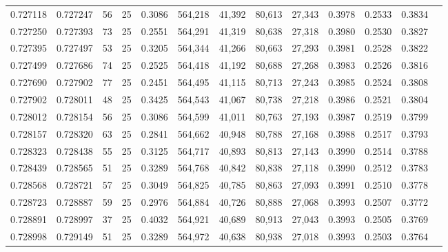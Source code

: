 \begin{tabular}{rrrrrrrrrrrrr}
0.727118 & 0.727247 &    56 &  25 &                                     0.3086 & 564,218 &  41,392 &  80,613 &  27,343 & 0.3978 & 0.2533 & 0.3834 \\
0.727250 & 0.727393 &    73 &  25 &                                     0.2551 & 564,291 &  41,319 &  80,638 &  27,318 & 0.3980 & 0.2530 & 0.3827 \\
0.727395 & 0.727497 &    53 &  25 &                                     0.3205 & 564,344 &  41,266 &  80,663 &  27,293 & 0.3981 & 0.2528 & 0.3822 \\
0.727499 & 0.727686 &    74 &  25 &                                     0.2525 & 564,418 &  41,192 &  80,688 &  27,268 & 0.3983 & 0.2526 & 0.3816 \\
0.727690 & 0.727902 &    77 &  25 &                                     0.2451 & 564,495 &  41,115 &  80,713 &  27,243 & 0.3985 & 0.2524 & 0.3808 \\
0.727902 & 0.728011 &    48 &  25 &                                     0.3425 & 564,543 &  41,067 &  80,738 &  27,218 & 0.3986 & 0.2521 & 0.3804 \\
0.728012 & 0.728154 &    56 &  25 &                                     0.3086 & 564,599 &  41,011 &  80,763 &  27,193 & 0.3987 & 0.2519 & 0.3799 \\
0.728157 & 0.728320 &    63 &  25 &                                     0.2841 & 564,662 &  40,948 &  80,788 &  27,168 & 0.3988 & 0.2517 & 0.3793 \\
0.728323 & 0.728438 &    55 &  25 &                                     0.3125 & 564,717 &  40,893 &  80,813 &  27,143 & 0.3990 & 0.2514 & 0.3788 \\
0.728439 & 0.728565 &    51 &  25 &                                     0.3289 & 564,768 &  40,842 &  80,838 &  27,118 & 0.3990 & 0.2512 & 0.3783 \\
0.728568 & 0.728721 &    57 &  25 &                                     0.3049 & 564,825 &  40,785 &  80,863 &  27,093 & 0.3991 & 0.2510 & 0.3778 \\
0.728723 & 0.728887 &    59 &  25 &                                     0.2976 & 564,884 &  40,726 &  80,888 &  27,068 & 0.3993 & 0.2507 & 0.3772 \\
0.728891 & 0.728997 &    37 &  25 &                                     0.4032 & 564,921 &  40,689 &  80,913 &  27,043 & 0.3993 & 0.2505 & 0.3769 \\
0.728998 & 0.729149 &    51 &  25 &                                     0.3289 & 564,972 &  40,638 &  80,938 &  27,018 & 0.3993 & 0.2503 & 0.3764 \\

\end{tabular}
